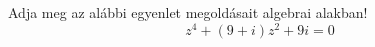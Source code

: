 \documentclass[11pt]{scrartcl}
\begin{document}
Adja meg az alábbi egyenlet megoldásait algebrai alakban!
\[
	z^4 + (9 + i) z^2 + 9i = 0
\]
\end{document}
